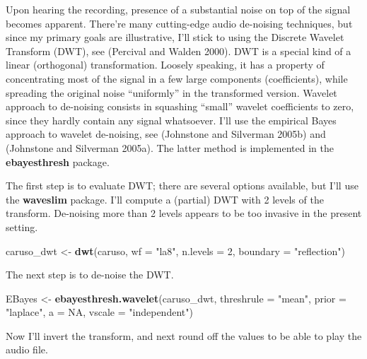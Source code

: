 \documentclass[]{tufte-handout}
\newenvironment{Shaded}{}{}
\newcommand{\KeywordTok}[1]{\textcolor[rgb]{0.00,0.44,0.13}{\textbf{#1}}}
\newcommand{\DataTypeTok}[1]{\textcolor[rgb]{0.56,0.13,0.00}{#1}}
\newcommand{\DecValTok}[1]{\textcolor[rgb]{0.25,0.63,0.44}{#1}}
\newcommand{\StringTok}[1]{\textcolor[rgb]{0.25,0.44,0.63}{#1}}
\newcommand{\OtherTok}[1]{\textcolor[rgb]{0.00,0.44,0.13}{#1}}
\newcommand{\OperatorTok}[1]{\textcolor[rgb]{0.40,0.40,0.40}{#1}}
\newcommand{\NormalTok}[1]{#1}
\begin{document}
Upon hearing the recording, presence of a substantial noise on top of
the signal becomes apparent. There're many cutting-edge audio de-noising
techniques, but since my primary goals are illustrative, I'll stick to
using the Discrete Wavelet Transform (DWT), see (Percival and Walden
2000). DWT is a special kind of a linear (orthogonal) transformation.
Loosely speaking, it has a property of concentrating most of the signal
in a few large components (coefficients), while spreading the original
noise ``uniformly'' in the transformed version. Wavelet approach to
de-noising consists in squashing ``small'' wavelet coefficients to zero,
since they hardly contain any signal whatsoever. I'll use the empirical
Bayes approach to wavelet de-noising, see (Johnstone and Silverman
2005b) and (Johnstone and Silverman 2005a). The latter method is
implemented in the \textbf{ebayesthresh} package.

The first step is to evaluate DWT; there are several options available,
but I'll use the \textbf{waveslim} package. I'll compute a (partial) DWT
with 2 levels of the transform. De-noising more than 2 levels appears to
be too invasive in the present setting.

\begin{Shaded}
\begin{Highlighting}[]
\NormalTok{caruso_dwt <-}\StringTok{ }\KeywordTok{dwt}\NormalTok{(caruso, }\DataTypeTok{wf =} \StringTok{"la8"}\NormalTok{, }\DataTypeTok{n.levels =} \DecValTok{2}\NormalTok{, }\DataTypeTok{boundary =} \StringTok{"reflection"}\NormalTok{)}
\end{Highlighting}
\end{Shaded}

The next step is to de-noise the DWT.

\begin{Shaded}
\begin{Highlighting}[]
\NormalTok{EBayes <-}\StringTok{ }\KeywordTok{ebayesthresh.wavelet}\NormalTok{(caruso_dwt, }\DataTypeTok{threshrule =} \StringTok{"mean"}\NormalTok{, }\DataTypeTok{prior =} \StringTok{"laplace"}\NormalTok{, }\DataTypeTok{a =} \OtherTok{NA}\NormalTok{, }\DataTypeTok{vscale =} \StringTok{"independent"}\NormalTok{)}
\end{Highlighting}
\end{Shaded}

Now I'll invert the transform, and next round off the values to be able
to play the audio file.

\begin{Shaded}
\end{Shaded}
\end{document}
